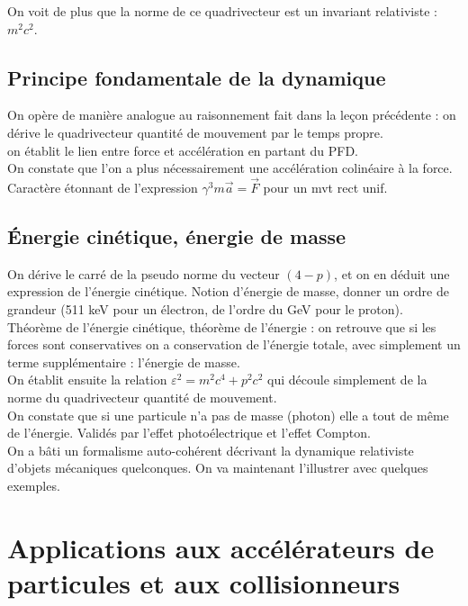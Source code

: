\documentclass[12pt,prb,aps,epsf]{article}
\begin{document}
On voit de plus que la norme de ce quadrivecteur est un invariant relativiste : $m^2c^2$.

\subsection{Principe fondamentale de la dynamique}
On opère de manière analogue au raisonnement fait dans la leçon précédente : on dérive le quadrivecteur quantité de mouvement par le temps propre.\\

on établit le lien entre force et accélération en partant du PFD.\\

On constate que l'on a plus nécessairement une accélération colinéaire à la force.\\

Caractère étonnant de l'expression $\gamma^3 m \vec{a} = \vec{F}$ pour un mvt rect unif.

\subsection{Énergie cinétique, énergie de masse}
On dérive le carré de la pseudo norme du vecteur $(4-p)$, et on en déduit une expression de l'énergie cinétique. Notion d'énergie de masse, donner un ordre de grandeur (511 keV pour un électron, de l'ordre du GeV pour le proton).\\

Théorème de l'énergie cinétique, théorème de l'énergie : on retrouve que si les forces sont conservatives on a conservation de l'énergie totale, avec simplement un terme supplémentaire : l'énergie de masse.\\

On établit ensuite la relation $\varepsilon^2 = m^2c^4 + p^2c^2$ qui découle simplement de la norme du quadrivecteur quantité de mouvement.\\

On constate que si une particule n'a pas de masse (photon) elle a tout de même de l'énergie. Validés par l'effet photoélectrique et l'effet Compton.\\

On a bâti un formalisme auto-cohérent décrivant la dynamique relativiste d'objets mécaniques quelconques. On va maintenant l'illustrer avec quelques exemples.

\section{Applications aux accélérateurs de particules et aux collisionneurs}
\end{document}
